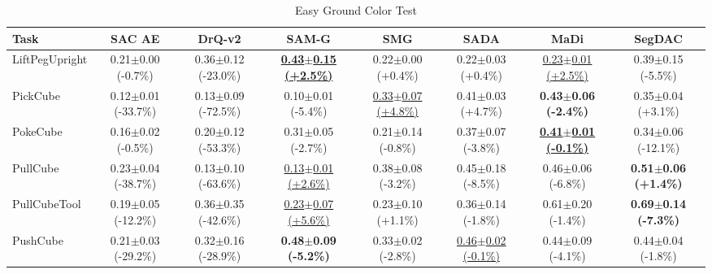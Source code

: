 \begin{table}[htbp]
\centering
\scriptsize
\caption{Easy Ground Color Test}
\label{tab:appendix_groundcolortest_easy}
\begin{adjustbox}{max width=\textwidth}
\begin{tabular}{l*{7}{c}}
\toprule
\textbf{Task} & \textbf{SAC AE} & \textbf{DrQ-v2} & \textbf{SAM-G} & \textbf{SMG} & \textbf{SADA} & \textbf{MaDi} & \textbf{SegDAC} \\
\midrule
LiftPegUpright & 0.21$\pm$0.00 \scriptsize{(-0.7\%)} & 0.36$\pm$0.12 \scriptsize{(-23.0\%)} & \textbf{\underline{0.43$\pm$0.15 \scriptsize{(+2.5\%)}}} & 0.22$\pm$0.00 \scriptsize{(+0.4\%)} & 0.22$\pm$0.03 \scriptsize{(+0.4\%)} & \underline{0.23$\pm$0.01 \scriptsize{(+2.5\%)}} & 0.39$\pm$0.15 \scriptsize{(-5.5\%)} \\
PickCube & 0.12$\pm$0.01 \scriptsize{(-33.7\%)} & 0.13$\pm$0.09 \scriptsize{(-72.5\%)} & 0.10$\pm$0.01 \scriptsize{(-5.4\%)} & \underline{0.33$\pm$0.07 \scriptsize{(+4.8\%)}} & 0.41$\pm$0.03 \scriptsize{(+4.7\%)} & \textbf{0.43$\pm$0.06 \scriptsize{(-2.4\%)}} & 0.35$\pm$0.04 \scriptsize{(+3.1\%)} \\
PokeCube & 0.16$\pm$0.02 \scriptsize{(-0.5\%)} & 0.20$\pm$0.12 \scriptsize{(-53.3\%)} & 0.31$\pm$0.05 \scriptsize{(-2.7\%)} & 0.21$\pm$0.14 \scriptsize{(-0.8\%)} & 0.37$\pm$0.07 \scriptsize{(-3.8\%)} & \textbf{\underline{0.41$\pm$0.01 \scriptsize{(-0.1\%)}}} & 0.34$\pm$0.06 \scriptsize{(-12.1\%)} \\
PullCube & 0.23$\pm$0.04 \scriptsize{(-38.7\%)} & 0.13$\pm$0.10 \scriptsize{(-63.6\%)} & \underline{0.13$\pm$0.01 \scriptsize{(+2.6\%)}} & 0.38$\pm$0.08 \scriptsize{(-3.2\%)} & 0.45$\pm$0.18 \scriptsize{(-8.5\%)} & 0.46$\pm$0.06 \scriptsize{(-6.8\%)} & \textbf{0.51$\pm$0.06 \scriptsize{(+1.4\%)}} \\
PullCubeTool & 0.19$\pm$0.05 \scriptsize{(-12.2\%)} & 0.36$\pm$0.35 \scriptsize{(-42.6\%)} & \underline{0.23$\pm$0.07 \scriptsize{(+5.6\%)}} & 0.23$\pm$0.10 \scriptsize{(+1.1\%)} & 0.36$\pm$0.14 \scriptsize{(-1.8\%)} & 0.61$\pm$0.20 \scriptsize{(-1.4\%)} & \textbf{0.69$\pm$0.14 \scriptsize{(-7.3\%)}} \\
PushCube & 0.21$\pm$0.03 \scriptsize{(-29.2\%)} & 0.32$\pm$0.16 \scriptsize{(-28.9\%)} & \textbf{0.48$\pm$0.09 \scriptsize{(-5.2\%)}} & 0.33$\pm$0.02 \scriptsize{(-2.8\%)} & \underline{0.46$\pm$0.02 \scriptsize{(-0.1\%)}} & 0.44$\pm$0.09 \scriptsize{(-4.1\%)} & 0.44$\pm$0.04 \scriptsize{(-1.8\%)} \\

\end{tabular}
\end{adjustbox}
\end{table}
